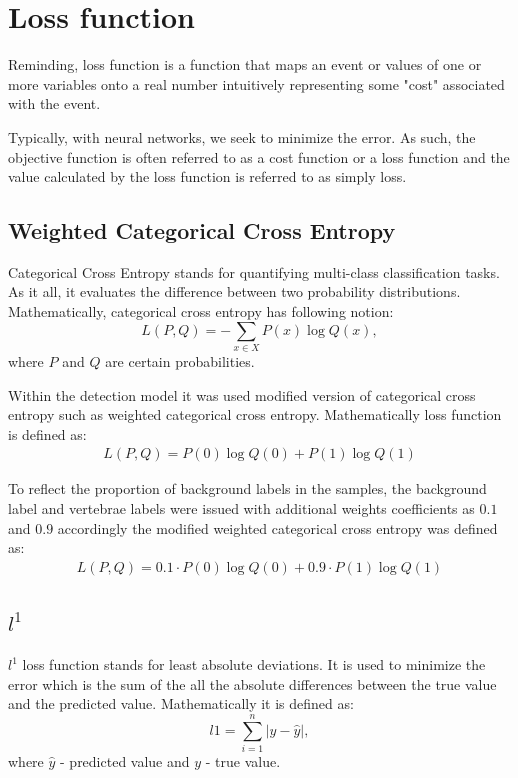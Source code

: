 \section{Loss function}
Reminding, loss function is a function that maps an event or values of one or more variables onto a real number intuitively representing some "cost" associated with the event. 

Typically, with neural networks, we seek to minimize the error. As such, the objective function is often referred to as a cost function or a loss function and the value calculated by the loss function is referred to as simply loss.

\subsection{Weighted Categorical Cross Entropy}
Categorical Cross Entropy stands for quantifying multi-class classification tasks. As it all, it evaluates the difference between two probability distributions. Mathematically, categorical cross entropy has following notion: \[L(P, Q) = - \sum_{x \in X} P(x) \log Q(x), \] 
where $P$ and $Q$ are certain probabilities. 

Within the detection model it was used modified version of categorical cross entropy such as weighted categorical cross entropy. Mathematically loss function is defined as:
\begin{align*}
 L(P, Q) = P(0)\log Q(0) + P(1)\log Q(1)
\end{align*}

To reflect the proportion of background labels in the samples, the background label and vertebrae labels were issued with additional weights coefficients as $0.1$ and $0.9$ accordingly the modified weighted categorical cross entropy was defined as:
\begin{align*}
 L(P, Q) = 0.1 \cdot P(0)\log Q(0) + 0.9 \cdot P(1)\log Q(1)
\end{align*}

\subsection{$l^{1}$}
$l^{1}$ loss function stands for least absolute deviations. It is used to minimize the error which is the sum of the all the absolute differences between the true value and the predicted value. Mathematically it is defined as: 
\[ \text{$l$1} = \sum_{i=1}^n |y - \hat{y}| , \]
where $\hat{y}$ - predicted value and $y$ - true value.


